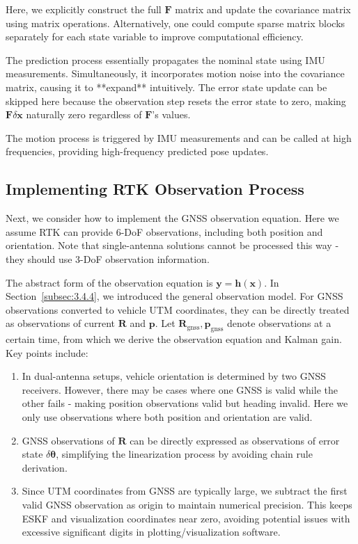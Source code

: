 Here, we explicitly construct the full $\bm{F}$ matrix and update the covariance matrix using matrix operations. Alternatively, one could compute sparse matrix blocks separately for each state variable to improve computational efficiency.  

The prediction process essentially propagates the nominal state using IMU measurements. Simultaneously, it incorporates motion noise into the covariance matrix, causing it to **expand** intuitively. The error state update can be skipped here because the observation step resets the error state to zero, making $\bm{F} \delta \bm{x}$ naturally zero regardless of $\bm{F}$'s values.  

The motion process is triggered by IMU measurements and can be called at high frequencies, providing high-frequency predicted pose updates.

\subsection{Implementing RTK Observation Process}
Next, we consider how to implement the GNSS observation equation. Here we assume RTK can provide 6-DoF observations, including both position and orientation. Note that single-antenna solutions cannot be processed this way - they should use 3-DoF observation information.

The abstract form of the observation equation is $\bm{y} = \bm{h}(\bm{x})$. In Section~\ref{subsec:3.4.4}, we introduced the general observation model. For GNSS observations converted to vehicle UTM coordinates, they can be directly treated as observations of current $\bm{R}$ and $\bm{p}$. Let $\bm{R}_{\mathrm{gnss}}, \bm{p}_{\mathrm{gnss}}$ denote observations at a certain time, from which we derive the observation equation and Kalman gain. Key points include:

\begin{enumerate}
	\item In dual-antenna setups, vehicle orientation is determined by two GNSS receivers. However, there may be cases where one GNSS is valid while the other fails - making position observations valid but heading invalid. Here we only use observations where both position and orientation are valid.
	
	\item GNSS observations of $\bm{R}$ can be directly expressed as observations of error state $\delta \boldsymbol{\theta}$, simplifying the linearization process by avoiding chain rule derivation.
	
	\item Since UTM coordinates from GNSS are typically large, we subtract the first valid GNSS observation as origin to maintain numerical precision. This keeps ESKF and visualization coordinates near zero, avoiding potential issues with excessive significant digits in plotting/visualization software.
\end{enumerate}

